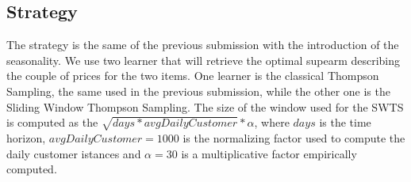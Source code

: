 \subsection*{Strategy}
The strategy is the same of the previous submission with the introduction of the seasonality. We use two learner that will retrieve the optimal supearm describing the couple of prices for the two items. One learner is the classical Thompson Sampling, the same used in the previous submission, while the other one is the Sliding Window Thompson Sampling. The size of the window used for the SWTS is computed as the $\sqrt{days * avgDailyCustomer} * \alpha$, where $days$ is the time horizon, $avgDailyCustomer = 1000$ is the normalizing factor used to compute the daily customer istances and $\alpha = 30 $ is a multiplicative factor empirically computed.

